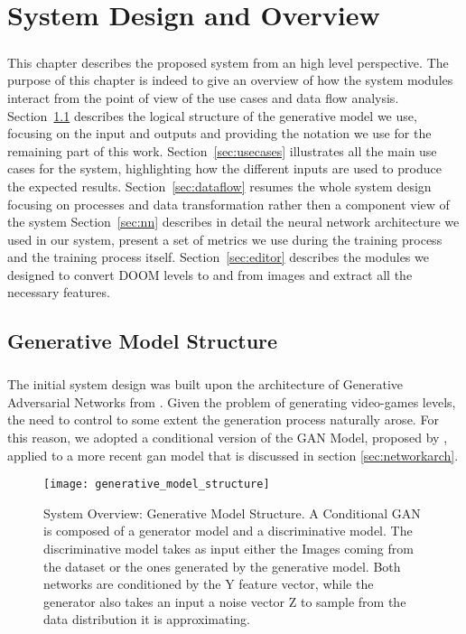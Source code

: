 \chapter{System Design and Overview}
\label{ch:system_design}
\paragraph{}
 This chapter describes the proposed system from an high level perspective. The purpose of this chapter is indeed to give an overview of how the system modules interact from the point of view of the use cases and data flow analysis. Section~\ref{sec:modelstructure} describes the logical structure of the generative model we use, focusing on the input and outputs and providing the notation we use for the remaining part of this work.
 Section~\ref{sec:usecases} illustrates all the main use cases for the system, highlighting how the different inputs are used to produce the expected results.
 Section~\ref{sec:dataflow} resumes the whole system design focusing on processes and data transformation rather then a component view of the system
 Section~\ref{sec:nn} describes in detail the neural network architecture we used in our system, present a set of metrics we use during the training process and the training process itself.
  Section~\ref{sec:editor} describes the modules we designed to convert DOOM levels to and from images and extract all the necessary features.  


\section{Generative Model Structure}
\label{sec:modelstructure}
\paragraph{} The initial system design was built upon the architecture of Generative Adversarial Networks \cite{gan} from \citeauthor{gan}. Given the problem of generating video-games levels, the need to control to some extent the generation process naturally arose. For this reason, we adopted a conditional version \cite{conditionalgan} of the GAN Model, proposed by \citeauthor{conditionalgan}, applied to a more recent \gls{gan} model that is discussed in section \ref{sec:networkarch}.


\begin{figure}[h!]
	\begin{center}
		\texttt{[image: generative\_model\_structure]}
	\end{center}
	
	\captionsetup{width=\linewidth}
	\caption[System Overview: Generative Model Structure]{ System Overview: Generative Model Structure. A Conditional GAN is composed of a generator model and a discriminative model. The discriminative model takes as input either the Images coming from the dataset or the ones generated by the generative model. Both networks are conditioned by the Y feature vector, while the generator also takes an input a noise vector Z to sample from the data distribution it is approximating. }
	\label{fig:genmodelstructure}
\end{figure}


